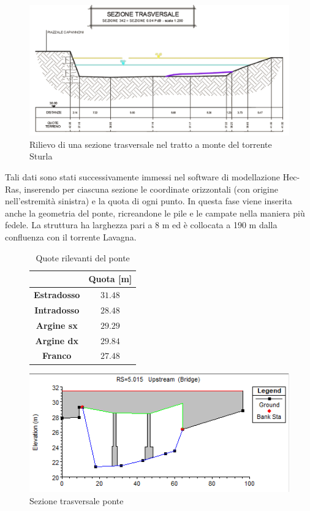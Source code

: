\documentclass[12pt]{article} %
\begin{document}
\begin{figure}[H]
    \centering
    \includegraphics[scale=0.7]{Sezione.png}
    \caption{Rilievo di una sezione trasversale nel tratto a monte del torrente Sturla}
    \label{fig:AutoCAD}
\end{figure}

\noindent Tali dati sono stati successivamente immessi nel software di modellazione Hec-Ras, inserendo per ciascuna sezione le coordinate orizzontali (con origine nell'estremità sinistra) e la quota di ogni punto. 
In questa fase viene inserita anche la geometria del ponte, ricreandone le pile e le campate nella maniera più fedele. La struttura ha larghezza pari a 8 m ed è collocata a 190 m dalla confluenza con il torrente Lavagna.

\begin{figure}[H]
\begin{minipage}[b]{0.39\textwidth}
\centering
    \begin{table}[H]
    \centering
    \begin{tabular}{cc}
        \hline
          & \textbf{Quota [m]}\\
          \hline
        \textbf{Estradosso} & $31.48$\\
        \textbf{Intradosso} & $28.48$\\
        \textbf{Argine sx} & $29.29$\\
        \textbf{Argine dx} & $29.84$\\
        \textbf{Franco} & $27.48$\\
        \hline
    \end{tabular}
    \caption{Quote rilevanti del ponte}
    \end{table}
\end{minipage}
\begin{minipage}[b]{0.6\textwidth}
    \centering
    \includegraphics[width=\columnwidth]{UPBridge.PNG}
    \caption{Sezione trasversale ponte}
\end{minipage}
\end{figure}
\end{document}
